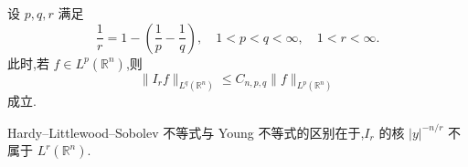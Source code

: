 \begin{theorem}\label{thm:4.2.3}
设 $p, q, r$ 满足
\begin{equation}
\frac{1}{r} = 1 - \left(\frac{1}{p} - \frac{1}{q}\right), \quad 1 < p < q < \infty, \quad 1 < r < \infty.\tag{4.2.3}
\label{eq:4.2.3}\end{equation}
此时,若 $f \in L^{p}(\mathbb{R}^{n})$,则
\begin{equation}
\|I_{r}f\|_{L^{q}(\mathbb{R}^{n})} \leq C_{n,p,q}\|f\|_{L^{p}(\mathbb{R}^{n})}\tag{4.2.4}
\label{eq:4.2.4}\end{equation}
成立.
\end{theorem}

Hardy--Littlewood--Sobolev 不等式与 Young 不等式的区别在于,$I_{r}$ 的核 $|y|^{-n/r}$ 不属于 $L^{r}(\mathbb{R}^{n})$.

